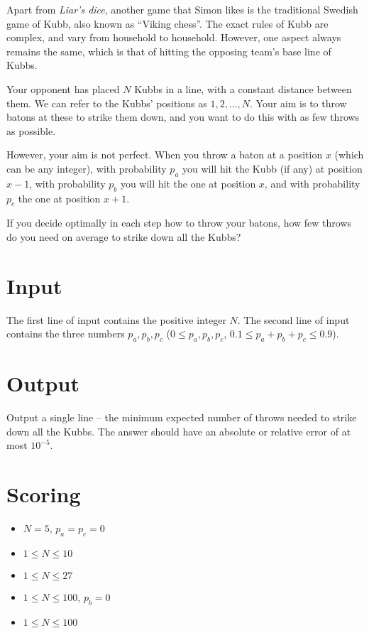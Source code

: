 Apart from \emph{Liar's dice}, another game that Simon likes is the traditional Swedish game of Kubb,
also known as ``Viking chess''.
The exact rules of Kubb are complex, and vary from household to household.
However, one aspect always remains the same, which is that of hitting the opposing team's base line of Kubbs.

Your opponent has placed $N$ Kubbs in a line, with a constant distance between them.
We can refer to the Kubbs' positions as $1, 2, \dots, N$.
Your aim is to throw batons at these to strike them down, and
you want to do this with as few throws as possible.

However, your aim is not perfect. When you throw a baton at a position $x$ (which can be any integer),
with probability $p_a$ you will hit the Kubb (if any) at position $x-1$,
with probability $p_b$ you will hit the one at position $x$, and
with probability $p_c$ the one at position $x+1$.

If you decide optimally in each step how to throw your batons,
how few throws do you need on average to strike down all the Kubbs?

\section*{Input}
The first line of input contains the positive integer $N$.
The second line of input contains the three numbers $p_a, p_b, p_c$ ($0 \le p_a, p_b, p_c$, $0.1 \le p_a + p_b + p_c \le 0.9$).

\section*{Output}
Output a single line -- the minimum expected number of throws needed to strike down all the Kubbs.
The answer should have an absolute or relative error of at most $10^{-5}$.

\section*{Scoring}
\begin{itemize}
  \item $N = 5$, $p_a = p_c = 0$
  \item $1 \le N \le 10$
  \item $1 \le N \le 27$
  \item $1 \le N \le 100$, $p_b = 0$
  \item $1 \le N \le 100$
\end{itemize}

